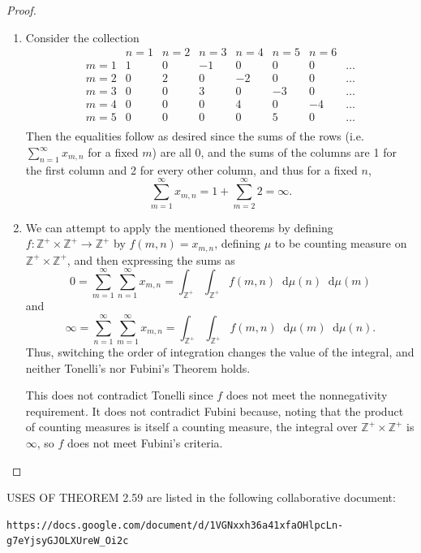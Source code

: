 \documentclass[12pt]{article}
\newcommand{\dd}{\mathop{}\!\mathrm{d}}
\theoremstyle{definition}
\begin{document}
\begin{proof}\
	\begin{enumerate}[label=(\alph*)]
		\item Consider the collection \begin{equation*}
			      \begin{array}{c|ccccccc}
				          & n=1 & n=2 & n=3 & n=4 & n=5 & n=6         \\
				      \hline
				      m=1 & 1   & 0   & -1  & 0   & 0   & 0   & \dots \\
				      m=2 & 0   & 2   & 0   & -2  & 0   & 0   & \dots \\
				      m=3 & 0   & 0   & 3   & 0   & -3  & 0   & \dots \\
				      m=4 & 0   & 0   & 0   & 4   & 0   & -4  & \dots \\
				      m=5 & 0   & 0   & 0   & 0   & 5   & 0   & \dots \\
			      \end{array}
		      \end{equation*}
		      Then the equalities follow as desired since the sums of the rows (i.e. $\sum_{n=1}^\infty x_{m,n}$ for a fixed $m$) are all 0, and the sums of the columns are 1 for the first column and 2 for every other column, and thus for a fixed $n$, \begin{equation*}
			      \sum_{m=1}^\infty x_{m,n} = 1 + \sum_{m=2}^\infty 2 = \infty.
		      \end{equation*}
		\item We can attempt to apply the mentioned theorems by defining $f : \mathbb{Z}^+ \times \mathbb{Z}^+ \to \mathbb{Z}^+$ by $f(m, n) = x_{m,n}$, defining $\mu$ to be counting measure on $\mathbb{Z}^+ \times \mathbb{Z}^+$, and then expressing the sums as \begin{equation*}
			      0 = \sum_{m=1}^\infty \sum_{n=1}^\infty x_{m,n} = \int_{\mathbb{Z}^+}\int_{\mathbb{Z}^+} f(m, n) \dd\mu(n) \dd\mu(m)
		      \end{equation*}
		      and \begin{equation*}
			      \infty = \sum_{n=1}^\infty \sum_{m=1}^\infty x_{m,n} = \int_{\mathbb{Z}^+}\int_{\mathbb{Z}^+} f(m, n) \dd\mu(m) \dd\mu(n).
		      \end{equation*}
		      Thus, switching the order of integration changes the value of the integral, and neither Tonelli's nor Fubini's Theorem holds.

		      This does not contradict Tonelli since $f$ does not meet the nonnegativity requirement.
		      It does not contradict Fubini because, noting that the product of counting measures is itself a counting measure, the integral over $\mathbb{Z}^+ \times \mathbb{Z}^+$ is $\infty$, so $f$ does not meet Fubini's criteria.
	\end{enumerate}
\end{proof}

USES OF THEOREM 2.59 are listed in the following collaborative document: \begin{verbatim}https://docs.google.com/document/d/1VGNxxh36a41xfaOHlpcLn-g7eYjsyGJOLXUreW_Oi2c\end{verbatim}
\end{document}
